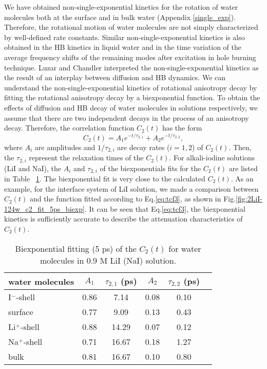 We have obtained non-single-exponential kinetics for the rotation of water molecules both at the surface 
and in bulk water (Appendix \ref{single_exp}).
Therefore, the rotational motion of water molecules are not simply characterized by well-defined rate constants. 
Similar non-single-exponential kinetics is also obtained in the HB kinetics
in liquid water \cite{AL96,Dirama2005} and in the time variation of the average frequency shifts of the 
remaining modes after excitation in hole burning technique.\cite{Rey2002,Moller2004} 
Luzar and Chandler interpreted the non-single-exponential kinetics as the result of an interplay between 
diffusion and HB dynamics. \cite{AL96} 
We can understand the non-single-exponential kinetics of rotational 
anisotropy decay by fitting the rotational anisotropy decay by a 
biexponential function.
To obtain the effects of diffusion and HB decay of water molecules
in solutions respectively, we assume that there are two independent 
decays in the process of an anisotropy decay. 
Therefore, the correlation function $C_2(t)$ has the form \cite{TanHS05}
\begin{equation}
C_2(t)=A_1e^{-t/\tau_{2,1}} +A_2e^{-t/\tau_{2,2}},
\label{eq:tcf3}
\end{equation}
where $A_i$ are amplitudes and $1/\tau_{2,i}$ are decay rates ($i=1, 2$) of $C_2(t)$. 
Then, the $\tau_{2,i}$ represent the relaxation times of the $C_2(t)$. 
For alkali-iodine solutions (LiI and NaI), the $A_i$ and $\tau_{2,i}$ of the biexponentials fits for 
the $C_2(t)$ are listed in Table ~\ref{tab:2LiI_c2_biexp}.
The biexponential fit is very close to the calculated $C_2(t)$. 
As an example, for the interface system of LiI solution, we made a comparison between $C_2(t)$ 
and the function fitted according to Eq.\thinspace\ref{eq:tcf3},
as shown in Fig.\thinspace\ref{fig:2LiI-124w_c2_fit_5ps_biexp}. 
It can be seen that Eq.\thinspace\ref{eq:tcf3}, the biexponential kinetics is sufficiently accurate to 
describe the attenuation characteristics of $C_2(t)$.                        
\begin{table}[H]%
\centering
\caption{\label{tab:2LiI_c2_biexp}%
	Biexponential fitting (5 ps) of the $C_2(t)$ for water molecules in 0.9 M LiI (NaI) solution.}
\begin{tabular}{lccccc}
water molecules & $A_1$  & $\tau_{2,1}$ (ps) & $A_2$ & $\tau_{2,2}$ (ps) \\
\hline
  I$^-$-shell & 0.86 & 7.14 & 0.08 & 0.10 \\
  surface & 0.77 & 9.09 & 0.13 & 0.43 \\
  Li$^+$-shell & 0.88 & 14.29 & 0.07 & 0.12\\
  Na$^+$-shell & 0.71 & 16.67 & 0.18 & 1.27 \\
  bulk & 0.81 & 16.67 & 0.10 & 0.80 \\
\end{tabular}
\end{table}

